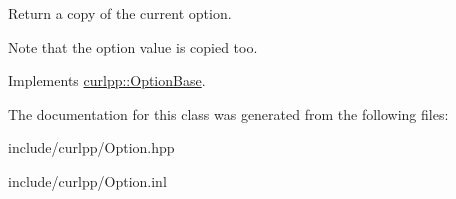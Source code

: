 Return a copy of the current option. 

Note that the option value is copied too. 

Implements \hyperlink{classcurlpp_1_1OptionBase_a55db7596ba57a679538c14adf5c680b4}{curlpp\-::\-Option\-Base}.



The documentation for this class was generated from the following files\-:\begin{DoxyCompactItemize}
\item 
include/curlpp/Option.\-hpp\item 
include/curlpp/Option.\-inl\end{DoxyCompactItemize}
